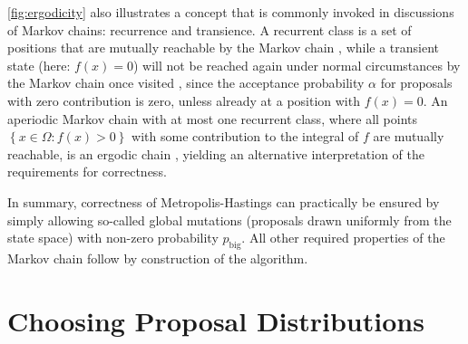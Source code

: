 \documentclass[oneside, a4paper]{article}
\begin{document}
\autoref{fig:ergodicity} also illustrates a concept that is commonly invoked in discussions of Markov chains: recurrence and transience. A recurrent class is a set of positions that are mutually reachable by the Markov chain \autocite{transient-recurrent}, while a transient state (here: $f(x)=0$) will not be reached again under normal circumstances by the Markov chain once visited \autocite{transient-recurrent}, since the acceptance probability $\alpha$ for proposals with zero contribution is zero, unless already at a position with $f(x)=0$. An aperiodic Markov chain with at most one recurrent class, where all points $\left\{ x \in \Omega: f(x)>0\right\}$ with some contribution to the integral of $f$ are mutually reachable, is an ergodic chain \autocite{transient-recurrent}, yielding an alternative interpretation of the requirements for correctness.


In summary, correctness of Metropolis-Hastings can practically be ensured by simply allowing so-called global mutations (proposals drawn uniformly from the state space) with non-zero probability $p_\text{big}$. All other required properties of the Markov chain follow by construction of the algorithm.

\section{Choosing Proposal Distributions}\label{sec:proposal-dist}
\end{document}
